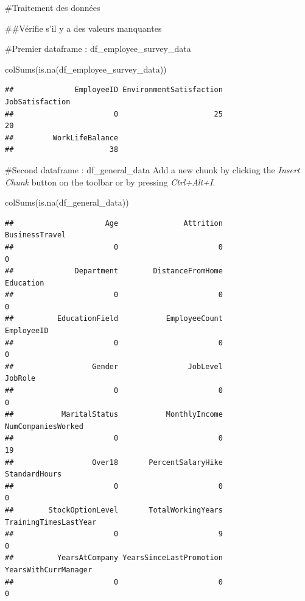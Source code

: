 \documentclass[
]{article}
\newenvironment{Shaded}{\begin{snugshade}}{\end{snugshade}}
\newcommand{\FunctionTok}[1]{\textcolor[rgb]{0.00,0.00,0.00}{#1}}
\newcommand{\NormalTok}[1]{#1}
\begin{document}
\#Traitement des données

\#\#Vérifie s'il y a des valeurs manquantes

\#Premier dataframe : df\_employee\_survey\_data

\begin{Shaded}
\begin{Highlighting}[]
\FunctionTok{colSums}\NormalTok{(}\FunctionTok{is.na}\NormalTok{(df\_employee\_survey\_data))}
\end{Highlighting}
\end{Shaded}

\begin{verbatim}
##              EmployeeID EnvironmentSatisfaction         JobSatisfaction 
##                       0                      25                      20 
##         WorkLifeBalance 
##                      38
\end{verbatim}

\#Second dataframe : df\_general\_data Add a new chunk by clicking the
\emph{Insert Chunk} button on the toolbar or by pressing
\emph{Ctrl+Alt+I}.

\begin{Shaded}
\begin{Highlighting}[]
\FunctionTok{colSums}\NormalTok{(}\FunctionTok{is.na}\NormalTok{(df\_general\_data))}
\end{Highlighting}
\end{Shaded}

\begin{verbatim}
##                     Age               Attrition          BusinessTravel 
##                       0                       0                       0 
##              Department        DistanceFromHome               Education 
##                       0                       0                       0 
##          EducationField           EmployeeCount              EmployeeID 
##                       0                       0                       0 
##                  Gender                JobLevel                 JobRole 
##                       0                       0                       0 
##           MaritalStatus           MonthlyIncome      NumCompaniesWorked 
##                       0                       0                      19 
##                  Over18       PercentSalaryHike           StandardHours 
##                       0                       0                       0 
##        StockOptionLevel       TotalWorkingYears   TrainingTimesLastYear 
##                       0                       9                       0 
##          YearsAtCompany YearsSinceLastPromotion    YearsWithCurrManager 
##                       0                       0                       0
\end{verbatim}
\end{document}
